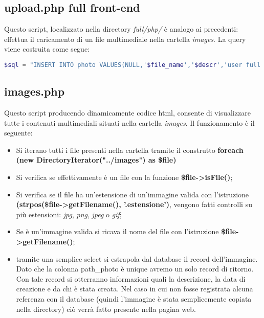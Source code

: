 \subsection{upload.php full front-end}
Questo script, localizzato nella directory \textit{full/php/} è analogo ai precedenti: effettua il caricamento di un file multimediale nella cartella \textit{images}.
La query viene costruita come segue:
\begin{lstlisting}[language=PHP]
$sql = "INSERT INTO photo VALUES(NULL,'$file_name','$descr','user full', '$time')";
\end{lstlisting}

\subsection{images.php}
Questo script producendo dinamicamente codice html, consente di visualizzare tutte i contenuti multimediali situati nella cartella \textit{images}. \newline
Il funzionamento è il seguente:
\begin{itemize}
\item Si iterano tutti i file presenti nella cartella tramite il construtto \newline \textbf{foreach (new DirectoryIterator("../images") as \$file) }
\item Si verifica se effettivamente è un file con la funzione \textbf{\$file->isFile()};
\item Si verifica se il file ha un'estensione di un'immagine valida con l'istruzione \textbf{(strpos(\$file->getFilename(), '.estensione')}, vengono fatti controlli su più estensioni:  \textit{jpg}, \textit{png}, \textit{jpeg} o \textit{gif};
\item Se è un'immagine valida si ricava il nome del file con l'istruzione \newline \textbf{\$file->getFilename()};
\item tramite una semplice select si estrapola dal database il record dell'immagine. \newline Dato che la colonna path\_photo è unique avremo un solo record di ritorno.
\newline Con tale record si otterranno informazioni quali la descrizione, la data di creazione e da chi è stata creata. \newline Nel caso in cui non fosse registrata alcuna referenza con il database (quindi l'immagine è stata semplicemente copiata nella directory) ciò verrà fatto presente nella pagina web.
\end{itemize}

